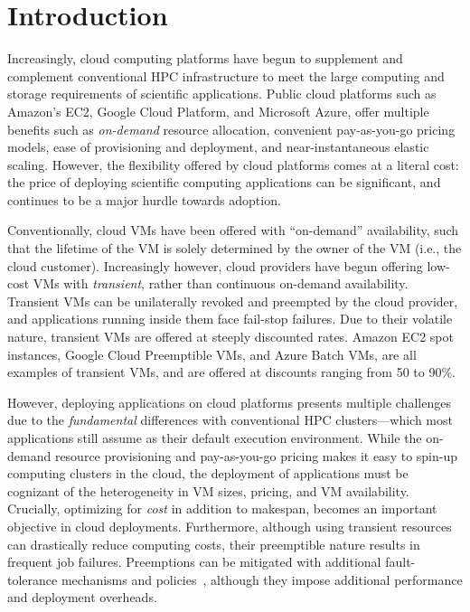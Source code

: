 \section{Introduction}
\label{sec:intro}

Increasingly, cloud computing platforms have begun to supplement and complement conventional HPC infrastructure to meet the large computing and storage requirements of scientific applications. Public cloud platforms such as Amazon's EC2, Google Cloud Platform, and Microsoft Azure, offer multiple benefits such as \emph{on-demand} resource allocation, convenient pay-as-you-go pricing models, ease of provisioning and deployment, and near-instantaneous elastic scaling. 
However, the flexibility offered by cloud platforms comes at a literal cost: the price of deploying scientific computing applications can be significant, and continues to be a major hurdle towards adoption. 

Conventionally, cloud VMs have been offered with ``on-demand'' availability, such that the lifetime of the VM is solely determined by the owner of the VM (i.e., the cloud customer). 
Increasingly however, cloud providers have begun offering low-cost VMs with \emph{transient}, rather than continuous on-demand availability. 
Transient VMs can be unilaterally revoked and preempted by the cloud provider, and applications running inside them face fail-stop failures. 
Due to their volatile nature, transient VMs are offered at steeply discounted rates. Amazon EC2 spot instances, Google Cloud Preemptible VMs, and Azure Batch VMs, are all examples of transient VMs, and are offered at discounts ranging from 50 to 90\%.  

However, deploying applications on cloud platforms presents multiple challenges due to the  \emph{fundamental} differences with conventional HPC clusters---which most applications still assume as their default execution environment.
While the on-demand resource provisioning and pay-as-you-go pricing makes it easy to spin-up computing clusters in the cloud, the deployment of applications must be cognizant of the heterogeneity in VM sizes, pricing, and VM availability. 
Crucially, optimizing for \emph{cost} in addition to makespan,  becomes an important objective in cloud deployments. 
Furthermore, although using transient resources can drastically reduce computing costs, their preemptible nature results in frequent job failures. 
Preemptions can be mitigated with additional fault-tolerance mechanisms and policies~\cite{flint, marathe2014exploiting}, although they impose additional performance and deployment overheads. 

